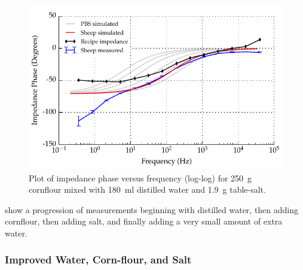 \begin{figure}
    \centering
    \includegraphics[width=\textwidth]{content/pt2/graphics/run14_180ml-distilledWater_250g-cornflour_1g9-salt_ZVsF_graph_phase}
    \caption{\label{fig:recipe_cornflour_salt_extraWater_phase}Plot of impedance phase versus frequency (log-log) for \SI{250}{\gram} cornflour mixed with \SI{180}{\milli\litre} distilled water and \SI{1.9}{\gram} table-salt.}
\end{figure}

 show a progression of measurements beginning with distilled water, then adding cornflour, then adding salt, and finally adding a very small amount of extra water.

\subsubsection{Improved Water, Corn-flour, and Salt}

